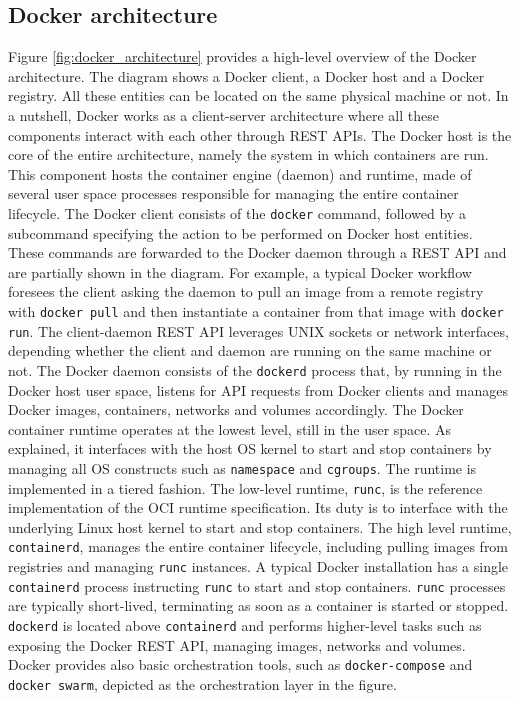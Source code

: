 \subsection{Docker architecture}
Figure \ref{fig:docker_architecture} provides a high-level overview of the Docker architecture. The diagram shows a Docker client, a Docker host and a Docker registry. All these entities can be located on the same physical machine or not. In a nutshell, Docker works as a client-server architecture where all these components interact with each other through REST APIs.
The Docker host is the core of the entire architecture, namely the system in which containers are run. This component hosts the container engine (daemon) and runtime, made of several user space processes responsible for managing the entire container lifecycle. 
The Docker client consists of the \texttt{docker} command, followed by a subcommand specifying the action to be performed on Docker host entities. 
These commands are forwarded to the Docker daemon through a REST API and are partially shown in the diagram. For example, a typical Docker workflow foresees the client asking the daemon to pull an image from a remote registry with \texttt{docker pull} and then instantiate a container from that image with \texttt{docker run}. 
The client-daemon REST API leverages UNIX sockets or network interfaces, depending whether the client and daemon are running on the same machine or not.
The Docker daemon consists of the \texttt{dockerd} process that, by running in the Docker host user space, listens for API requests from Docker clients and manages Docker images, containers, networks and volumes accordingly. 
The Docker container runtime operates at the lowest level, still in the user space. As explained, it interfaces with the host OS kernel to start and stop containers by managing all OS constructs such as \texttt{namespace} and \texttt{cgroups}.
The runtime is implemented in a tiered fashion. The low-level runtime, \texttt{runc}, is the reference implementation of the OCI runtime specification. Its duty is to interface with the underlying Linux host kernel to start and stop containers. The high level runtime, \texttt{containerd}, manages the entire container lifecycle, including pulling images from registries and managing \texttt{runc} instances. \newline
A typical Docker installation has a single \texttt{containerd} process instructing \texttt{runc} to start and stop containers. \texttt{runc} processes are typically short-lived, terminating as soon as a container is started or stopped.
\texttt{dockerd} is located above \texttt{containerd} and performs higher-level tasks such as exposing the Docker REST API, managing images, networks and volumes. 
Docker provides also basic orchestration tools, such as \texttt{docker-compose} and \texttt{docker swarm}, depicted as the orchestration layer in the figure.

